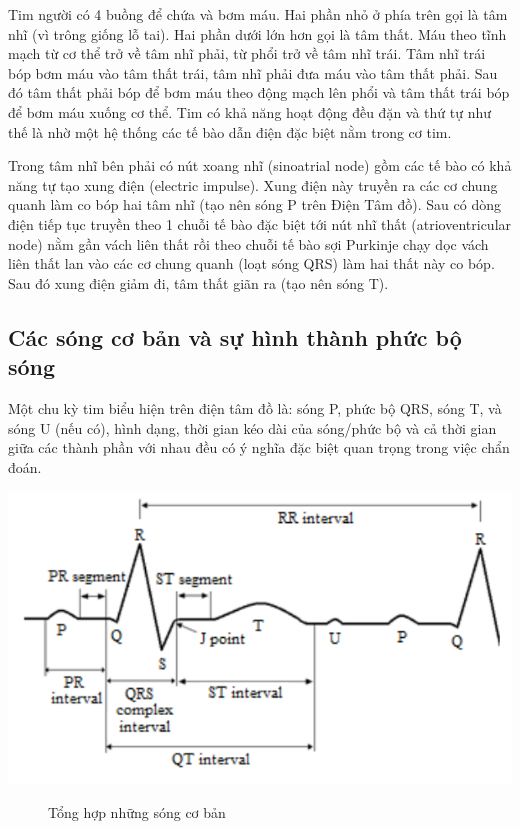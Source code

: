 Tim người có 4 buồng để chứa và bơm máu. Hai phần nhỏ ở phía trên gọi là tâm nhĩ (vì trông giống lỗ tai). Hai phần dưới lớn hơn gọi là tâm thất. Máu theo tĩnh mạch từ cơ thể trở về tâm nhĩ phải, từ phổi trở về tâm nhĩ trái. Tâm nhĩ trái bóp bơm máu vào tâm thất trái, tâm nhĩ phải đưa máu vào tâm thất phải. Sau đó tâm thất phải bóp để bơm máu theo động mạch lên phổi và tâm thất trái bóp để bơm máu xuống cơ thể. Tim có khả năng hoạt động đều đặn và thứ tự như thế là nhờ một hệ thống các tế bào dẫn điện đặc biệt nằm trong cơ tim.

Trong tâm nhĩ bên phải có nút xoang nhĩ (sinoatrial node) gồm các tế bào có khả năng tự tạo xung điện (electric impulse). Xung điện này truyền ra các cơ chung quanh làm co bóp hai tâm nhĩ (tạo nên sóng P trên Điện Tâm đồ). Sau có dòng điện tiếp tục truyền theo 1 chuỗi tế bào đặc biệt tới nút nhĩ thất (atrioventricular node) nằm gần vách liên thất rồi theo chuỗi tế bào sợi Purkinje chạy dọc vách liên thất lan vào các cơ chung quanh (loạt sóng QRS) làm hai thất này co bóp. Sau đó xung điện giảm đi, tâm thất giãn ra (tạo nên sóng T).

\subsection{Các sóng cơ bản và sự hình thành phức bộ sóng}
Một chu kỳ tim biểu hiện trên điện tâm đồ là: sóng P, phức bộ QRS, sóng T, và sóng U (nếu có), hình dạng, thời gian kéo dài của sóng/phức bộ và cả thời gian giữa các thành phần với nhau đều có ý nghĩa đặc biệt quan trọng trong việc chẩn đoán.
\begin{center}
        \includegraphics[scale=.4]{image/week1/h32.png}
        \begin{figure}[htp]
        \begin{center}
        \end{center}
        \caption{Tổng hợp những sóng cơ bản}
        \end{figure}
\end{center}

